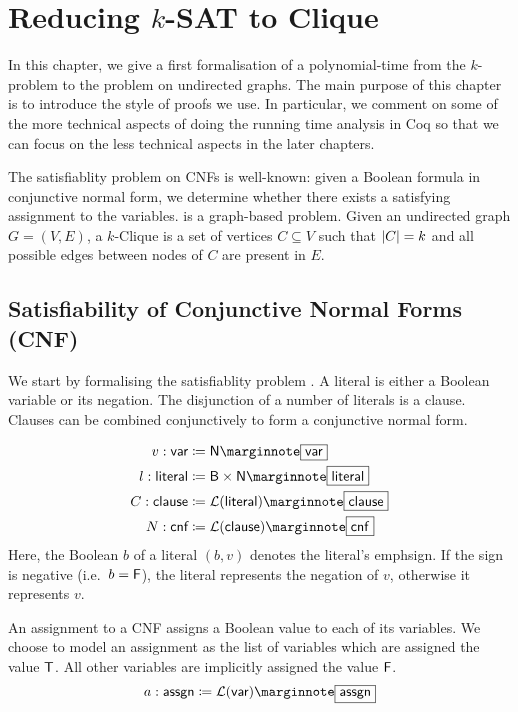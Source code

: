 
\chapter{Reducing $k$-SAT to Clique}\label{chap:ksat_clique}
In this chapter, we give a first formalisation of a polynomial-time from the $k$-\SAT{} problem to the \Clique{} problem on undirected graphs. The main purpose of this chapter is to introduce the style of proofs we use. In particular, we comment on some of the more technical aspects of doing the running time analysis in Coq so that we can focus on the less technical aspects in the later chapters.

The satisfiablity problem on CNFs is well-known: given a Boolean formula in conjunctive normal form, we determine whether there exists a satisfying assignment to the variables. 
\Clique{} is a graph-based problem. Given an undirected graph $G = (V, E)$, a $k$-Clique is a set of vertices $C \subseteq V$ such that $|C| = k$ and all possible edges between nodes of $C$ are present in $E$. 

\section{Satisfiability of Conjunctive Normal Forms (CNF)}
We start by formalising the satisfiablity problem \SAT{}.
A literal is either a Boolean variable or its negation. The disjunction of a number of literals is a clause. Clauses can be combined conjunctively to form a conjunctive normal form. 

\newcommand*{\bvar}{\textsf{var}}
\newcommand*{\literal}{\textsf{literal}}
\newcommand*{\clause}{\textsf{clause}}
\newcommand*{\cnf}{\textsf{cnf}}
\newcommand*{\assgn}{\textsf{assgn}}
\newcommand*{\eval}{\mathcal{E}}
\newcommand*{\evalA}[2]{\eval~#1~#2}
\begin{align*}
  v : \bvar &\defeq \nat \mnote{\bvar}\\
  l : \literal &\defeq \bool \times \nat \mnote{\literal}\\
  C : \clause &\defeq \listsof{\literal} \mnote{\clause}\\
  N : \cnf &\defeq \listsof{\clause} \mnote{\cnf}
\end{align*}
Here, the Boolean $b$ of a literal $(b, v)$ denotes the literal's emph{sign}. If the sign is negative (i.e.\ $b = \mathsf{F}$), the literal represents the negation of $v$, otherwise it represents $v$.

An assignment to a CNF assigns a Boolean value to each of its variables. We choose to model an assignment as the list of variables which are assigned the value $\mathsf{T}$. All other variables are implicitly assigned the value $\mathsf{F}$.
\[a : \assgn \defeq \listsof{\bvar}\mnote{\assgn} \]

